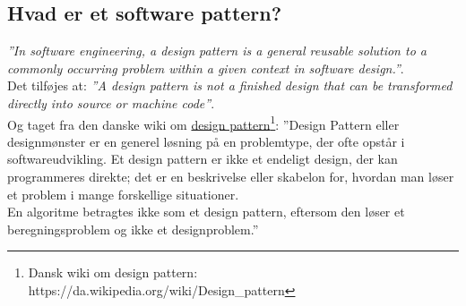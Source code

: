 \subsection{Hvad er et software pattern?}
\textit{''In software engineering, a design pattern is a general reusable solution to a commonly occurring problem within a given context in software design.''}.\\

Det tilføjes at: 
\textit{''A design pattern is not a finished design that can be transformed directly into source or machine code''}.\\

Og taget fra den danske wiki om \href{https://da.wikipedia.org/wiki/Design_pattern}{design pattern\footnote{Dansk wiki om design pattern:  \url{https://da.wikipedia.org/wiki/Design_pattern}}}:
''Design Pattern eller designmønster er en generel løsning på en problemtype, der ofte opstår i softwareudvikling. Et design pattern er ikke et endeligt design, der kan programmeres direkte; det er en beskrivelse eller skabelon for, hvordan man løser et problem i mange forskellige situationer.\\

En algoritme betragtes ikke som et design pattern, eftersom den løser et beregningsproblem og ikke et designproblem.''
